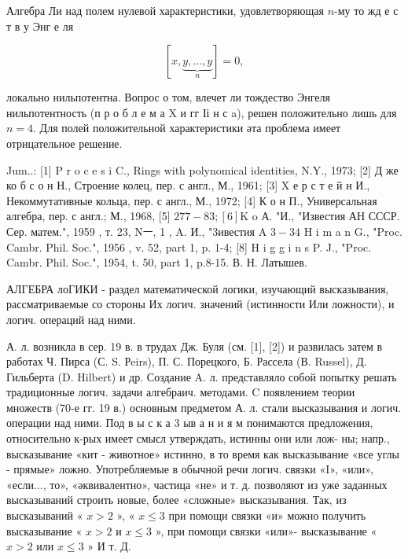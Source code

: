\documentclass[10pt]{article}
\begin{document}
Алгебра Ли над полем нулевой характеристики, удовлетворяющая $n$-му то жд е с т в у Энг е ля



\[

[x, \underbrace{y, \ldots, y}_{n}]=0,

\]



локально нильпотентна. Вопрос о том, влечет ли тождество Энгеля нильпотентность (п р о б л е м а X и гг Іі н с a), решен положительно лишь для $n=4$. Для полей положительной характеристики әта проблема имеет отрицательное решение.



Jum..: [1] P r o c e s i C., Rings with polynomical identities, N.Y., 1973; [2] Д же ко б с о н Н., Строение колец, пер. с англ., М., 1961; [3] X е р с т е й н И., Некоммутативные кольца, пер. с англ., М., 1972; [4] К о н П., Универсальная алгебра, пер. с англ.; М., 1968, [5] $277-83 ;[6] \mathrm{K}$ o А. "И., "Известия АН СССР. Сер. матем.", 1959 , т. 23, Nㅡ, 1 , A. И., "3ивестия A $3-34$ H i m a n G., "Proc. Cambr. Phil. Soc.", 1956 , v. 52, part 1, p. 1-4; [8] H i g g i n s P. J., "Proc. Cambr. Phil. Soc.", 1954, t. 50, part 1, p.8-15. В. Н. Латышев.



АЛГЕБРА лоГИКИ - раздел математической логики, изучающий высказывания, рассматриваемые со стороны Их логич. значений (истинности Или ложности), и логич. операций над ними.



А. л. возникла в сер. 19 в. в трудах Дж. Буля (см. [1], [2]) и развилась затем в работах Ч. Пирса (С. S. Рeirs), П. С. Порецкого, Б. Рассела (В. Russel), Д. Гильберта (D. Hilbert) и др. Создание A. л. представляло собой попытку решать традиционные логич. задачи алгебраич. методами. C появлением теории множеств (70-е гг. 19 в.) основным предметом А. л. стали высказывания и логич. операции над ними. Под в ы с к а 3 ыв а н и я м понимаются предложения, относительно к-рых имеет смысл утверждать, истинны они или лож- ны; напр., высказывание «кит - животное» истинно, в то время как высказывание «все углы - прямые» ложно. Употребляемые в обычной речи логич. связки «I», «или», «если..., то», «әквивалентно», частица «не» и т. д. позволяют из уже заданных высказываний строить новые, более «сложные» высказывания. Так, из высказываний « $x>2$ », « $x \leqslant 3$ при помощи связки «и» можно получить высказывание « $x>2$ и $x \leqslant 3$ », при помощи связки «или»- высказывание « $x>2$ или $x \leqslant 3$ » И т. Д.
\end{document}
